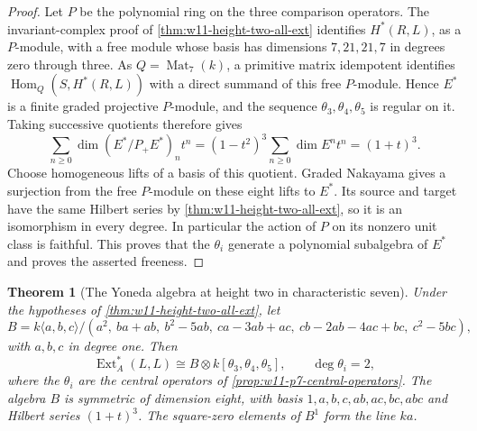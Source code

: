 \documentclass[11pt,reqno]{amsart}
\newtheorem{theorem}{Theorem}[section]
\theoremstyle{definition}
\theoremstyle{remark}
\theoremstyle{definition}
\newcommand{\Mat}{\operatorname{Mat}}
\newcommand{\Hom}{\operatorname{Hom}}
\newcommand{\Ext}{\operatorname{Ext}}
\begin{document}
\begin{proof}
Let $P$ be the polynomial ring on the three comparison operators.
The invariant-complex proof of
\cref{thm:w11-height-two-all-ext} identifies $H^*(R,L)$, as a
$P$-module, with a free module whose basis has dimensions
$7,21,21,7$ in degrees zero through three.
As $Q=\Mat_7(k)$, a primitive
matrix idempotent identifies $\Hom_Q(S,H^*(R,L))$ with a direct
summand of this free $P$-module. Hence $E^*$ is a finite graded
projective $P$-module, and the sequence
$\theta_3,\theta_4,\theta_5$ is regular on it.
Taking successive quotients therefore gives
\[
 \sum_{n\ge0}\dim(E^*/P_+E^*)_nt^n
 =(1-t^2)^3\sum_{n\ge0}\dim E^nt^n=(1+t)^3.
\]
Choose homogeneous lifts of a basis of this quotient.
Graded Nakayama gives a surjection from the free $P$-module on these
eight lifts to $E^*$. Its source and target have the same Hilbert
series by \cref{thm:w11-height-two-all-ext}, so it is an isomorphism
in every degree. In particular the action of $P$ on its nonzero
unit class is faithful. This proves that the $\theta_i$ generate
a polynomial subalgebra of $E^*$ and proves the asserted freeness.
\end{proof}

\begin{theorem}[The Yoneda algebra at height two in characteristic seven]
\label{thm:w11-p7-yoneda}
Under the hypotheses of \cref{thm:w11-height-two-all-ext}, let
\[
 B=k\langle a,b,c\rangle/
 (a^2,\ ba+ab,\ b^2-5ab,\ ca-3ab+ac,\
 cb-2ab-4ac+bc,\ c^2-5bc),
\]
with $a,b,c$ in degree one. Then
\[
 \Ext_A^*(L,L)\cong B\otimes k[\theta_3,\theta_4,\theta_5],
 \qquad \deg\theta_i=2,
\]
where the $\theta_i$ are the central operators of
\cref{prop:w11-p7-central-operators}.
The algebra $B$ is symmetric of dimension eight, with basis
$1,a,b,c,ab,ac,bc,abc$ and Hilbert series $(1+t)^3$.
The square-zero elements of $B^1$ form the line $ka$.
\end{theorem}
\end{document}
